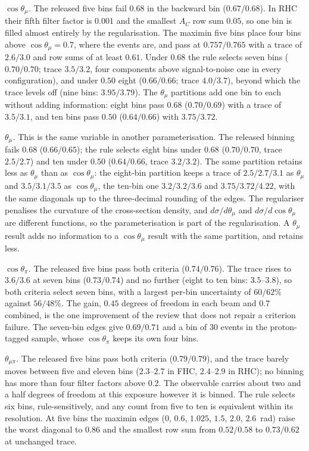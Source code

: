\documentclass[11pt,a4paper]{article}
\begin{document}
\emph{$\cos\theta_\mu$.} The released five bins fail $0.68$ in the backward bin ($0.67/0.68$). In RHC
their fifth filter factor is $0.001$ and the smallest $A_C$ row sum $0.05$, so one bin is filled
almost entirely by the regularisation. The maximin five bins place four bins above
$\cos\theta_\mu=0.7$, where the events are, and pass at $0.757/0.765$ with a trace of $2.6/3.0$ and
row sums of at least $0.61$. Under $0.68$ the rule selects seven bins ($0.70/0.70$; trace
$3.5/3.2$, four components above signal-to-noise one in every configuration), and under $0.50$ eight
($0.66/0.66$; trace $4.0/3.7$), beyond which the trace levels off (nine bins: $3.95/3.79$). The
$\theta_\mu$ partitions add one bin to each without adding information: eight bins pass $0.68$
($0.70/0.69$) with a trace of $3.5/3.1$, and ten bins pass $0.50$ ($0.64/0.66$) with
$3.75/3.72$.

\emph{$\theta_\mu$.} This is the same variable in another parameterisation. The released binning
fails $0.68$ ($0.66/0.65$); the rule selects eight bins under $0.68$ ($0.70/0.70$, trace
$2.5/2.7$) and ten under $0.50$ ($0.64/0.66$, trace $3.2/3.2$). The same partition retains less as
$\theta_\mu$ than as $\cos\theta_\mu$: the eight-bin partition keeps a trace of $2.5/2.7/3.1$ as
$\theta_\mu$ and $3.5/3.1/3.5$ as $\cos\theta_\mu$, the ten-bin one $3.2/3.2/3.6$ and
$3.75/3.72/4.22$, with the same diagonals up to the three-decimal rounding of the edges. The
regulariser penalises the curvature of the cross-section density, and $d\sigma/d\theta_\mu$ and
$d\sigma/d\cos\theta_\mu$ are different functions, so the parameterisation is part of the
regularisation. A $\theta_\mu$ result adds no information to a $\cos\theta_\mu$ result with the same
partition, and retains less.

\emph{$\cos\theta_\pi$.} The released five bins pass both criteria ($0.74/0.76$). The trace rises to
$3.6/3.6$ at seven bins ($0.73/0.74$) and no further (eight to ten bins: $3.5$--$3.8$), so both
criteria select seven bins, with a largest per-bin uncertainty of $60/62\%$ against $56/48\%$. The
gain, $0.45$ degrees of freedom in each beam and $0.7$ combined, is the one improvement of the review
that does not repair a criterion failure. The seven-bin edges give $0.69/0.71$ and a bin of $30$
events in the proton-tagged sample, whose $\cos\theta_\pi$ keeps its own four bins.

\emph{$\theta_{\mu\pi}$.} The released five bins pass both criteria ($0.79/0.79$), and the trace
barely moves between five and eleven bins ($2.3$--$2.7$ in FHC, $2.4$--$2.9$ in RHC); no binning has
more than four filter factors above $0.2$. The observable carries about two and a half degrees of
freedom at this exposure however it is binned. The rule selects six bins, rule-sensitively, and any
count from five to ten is equivalent within its resolution. At five bins the maximin edges
($0$, $0.6$, $1.025$, $1.5$, $2.0$, $2.6$~rad) raise the worst diagonal to $0.86$ and the smallest row
sum from $0.52/0.58$ to $0.73/0.62$ at unchanged trace.
\end{document}
